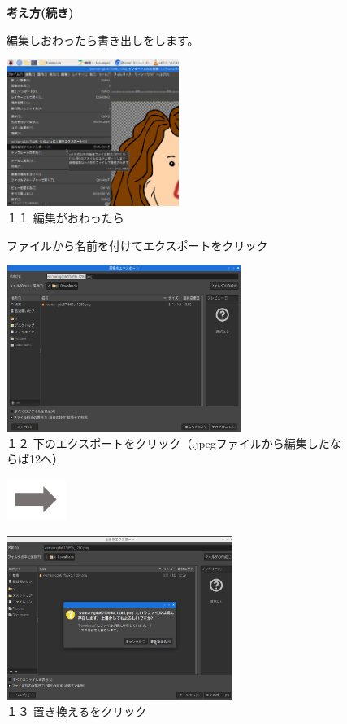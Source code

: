 \documentclass[a4paper,12pt]{jarticle}
\begin{document}
\clearpage
\begin{figure}
  \textbf{考え方(続き)}


  編集しおわったら書き出しをします。

  \centering
  \begin{minipage}{\textwidth}
    \includegraphics[width=0.5\textwidth]{textbook-img138.png}\\
    １１ 編集がおわったら

    ファイルから名前を付けてエクスポートをクリック
  \end{minipage}

  \bigskip


  \begin{minipage}{\textwidth}
    \begin{minipage}{7.7cm}
      \includegraphics[width=7.615cm]{textbook-img137.png}\\
      １２
      下のエクスポートをクリック（.jpegファイルから編集したならば12へ）
    \end{minipage}
    \includegraphics[width=1.919cm]{textbook-img135.png}
    \begin{minipage}{7.786cm}
      \includegraphics[width=7.352cm]{textbook-img136.png}\\
      １３ 置き換えるをクリック
    \end{minipage}
  \end{minipage}


\end{figure}
\end{document}
